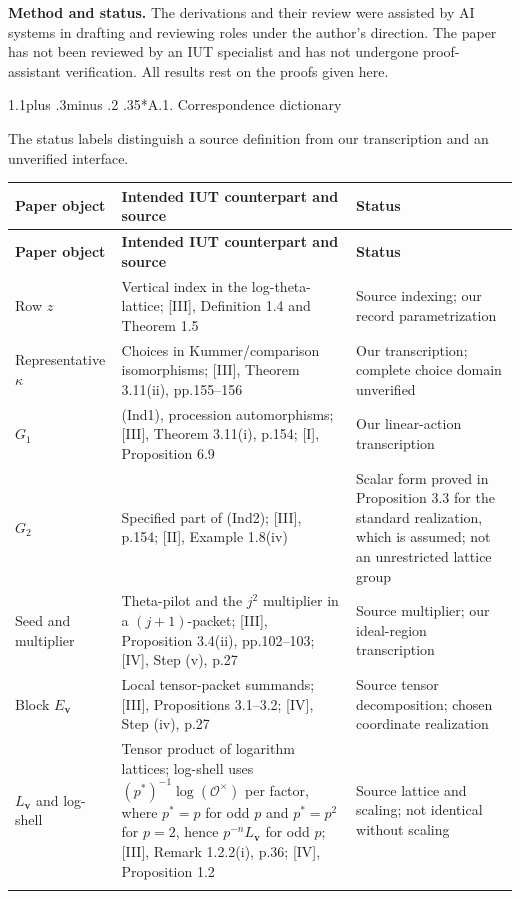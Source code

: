 \documentclass[11pt,a4paper]{amsart}
\makeatletter
\renewcommand\subsection{\@startsection{subsection}{2}{\z@}
{1.1\baselineskip plus .3\baselineskip minus .2\baselineskip}
{.35\baselineskip}{\normalfont\bfseries}}
\makeatother
\begin{document}
\textbf{Method and status.} The derivations and their review were assisted by AI systems in drafting and reviewing roles under the author's direction. The paper has not been reviewed by an IUT specialist and has not undergone proof-assistant verification. All results rest on the proofs given here.


\subsection*{A.1. Correspondence dictionary}

The status labels distinguish a source definition from our transcription and an unverified interface.


\Needspace{130pt}
{\footnotesize
\setlength{\tabcolsep}{4pt}
\begin{longtable}{@{}P{0.2\textwidth}P{0.44\textwidth}P{0.29\textwidth}@{}}
\toprule
\textbf{Paper object} & \textbf{Intended IUT counterpart and source} & \textbf{Status}\\\midrule
\endfirsthead
\toprule
\textbf{Paper object} & \textbf{Intended IUT counterpart and source} & \textbf{Status}\\\midrule
\endhead
\bottomrule\endfoot
Row $z$ & Vertical index in the log-theta-lattice; [III], Definition 1.4 and Theorem 1.5 & Source indexing; our record parametrization\\\addlinespace[3pt]
Representative $\kappa$ & Choices in Kummer/comparison isomorphisms; [III], Theorem 3.11(ii), pp.155--156 & Our transcription; complete choice domain unverified\\\addlinespace[3pt]
$G_1$ & (Ind1), procession automorphisms; [III], Theorem 3.11(i), p.154; [I], Proposition 6.9 & Our linear-action transcription\\\addlinespace[3pt]
$G_2$ & Specified part of (Ind2); [III], p.154; [II], Example 1.8(iv) & Scalar form proved in Proposition 3.3 for the standard realization, which is assumed; not an unrestricted lattice group\\\addlinespace[3pt]
Seed and multiplier & Theta-pilot and the $j^2$ multiplier in a $(j+1)$-packet; [III], Proposition 3.4(ii), pp.102--103; [IV], Step (v), p.27 & Source multiplier; our ideal-region transcription\\\addlinespace[3pt]
Block $E_{\mathbf v}$ & Local tensor-packet summands; [III], Propositions 3.1--3.2; [IV], Step (iv), p.27 & Source tensor decomposition; chosen coordinate realization\\\addlinespace[3pt]
$L_{\mathbf v}$ and log-shell & Tensor product of logarithm lattices; log-shell uses $(p^*)^{-1}\log(\mathcal O^\times)$ per factor, where $p^*=p$ for odd $p$ and $p^*=p^2$ for $p=2$, hence $p^{-n}L_{\mathbf v}$ for odd $p$; [III], Remark 1.2.2(i), p.36; [IV], Proposition 1.2 & Source lattice and scaling; not identical without scaling\\\addlinespace[3pt]

\end{longtable}}
\end{document}
